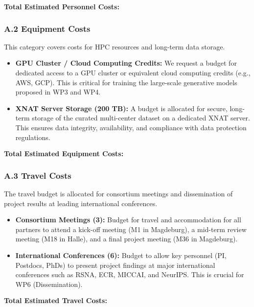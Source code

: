 \textbf{Total Estimated Personnel Costs: }

\subsubsection*{A.2 Equipment Costs}
This category covers costs for HPC resources and long-term data storage.
\begin{itemize}
    \item \textbf{GPU Cluster / Cloud Computing Credits:} We request a budget for dedicated access to a GPU cluster or equivalent cloud computing credits (e.g., AWS, GCP). This is critical for training the large-scale generative models proposed in WP3 and WP4.
    \item \textbf{XNAT Server Storage (200 TB):} A budget is allocated for secure, long-term storage of the curated multi-center dataset on a dedicated XNAT server. This ensures data integrity, availability, and compliance with data protection regulations.
\end{itemize}

\textbf{Total Estimated Equipment Costs: }

\subsubsection*{A.3 Travel Costs}
The travel budget is allocated for consortium meetings and dissemination of project results at leading international conferences.
\begin{itemize}
    \item \textbf{Consortium Meetings (3):} Budget for travel and accommodation for all partners to attend a kick-off meeting (M1 in Magdeburg), a mid-term review meeting (M18 in Halle), and a final project meeting (M36 in Magdeburg).
    \item \textbf{International Conferences (6):} Budget to allow key personnel (PI, Postdocs, PhDs) to present project findings at major international conferences such as RSNA, ECR, MICCAI, and NeurIPS. This is crucial for WP6 (Dissemination).
\end{itemize}

\textbf{Total Estimated Travel Costs: }

